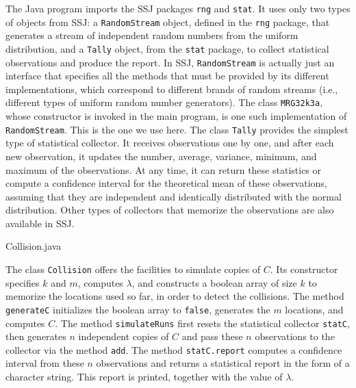 The Java program imports the SSJ packages \texttt{rng} and \texttt{stat}.
It uses only two types of objects from SSJ:
a \texttt{RandomStream} object, defined in the \texttt{rng} package,
that generates a stream of independent random numbers from the uniform distribution,
and a \texttt{Tally} object, from the \texttt{stat} package,
to collect statistical observations and produce the report.
In SSJ, \texttt{RandomStream} is actually just an interface that specifies all
the methods that must be provided by its different implementations, which
correspond to different brands of random streams (i.e., different types of
uniform random number generators).
The class \texttt{MRG32k3a}, whose constructor is invoked in the main program,
is one such implementation of \texttt{RandomStream}.  This is the one we use here.
The class \texttt{Tally} provides the simplest type of statistical collector.
It receives observations one by one, and after each new observation,
it updates the number, average,
variance, minimum, and maximum of the observations.
At any time, it can return these statistics or compute a confidence interval
for the theoretical mean of these observations, assuming that they are
independent and identically distributed with the normal distribution.
Other types of collectors that memorize the observations are also available in SSJ.



{Collision.java}

The class \texttt{Collision} offers the facilities to simulate copies of $C$.
Its constructor specifies $k$ and $m$, computes $\lambda$, and constructs
a boolean array of size $k$ to memorize the locations used so far,
in order to detect the collisions.
The method \texttt{generateC} initializes the boolean array to \texttt{false},
generates the $m$ locations, and computes $C$.
The method \texttt{simulateRuns} first resets the statistical collector \texttt{statC},
then generates $n$ independent copies of $C$ and pass these $n$ observations
to the collector via the method \texttt{add}.
The method \texttt{statC.report} computes a confidence interval from
these $n$ observations and returns a statistical report in the form of a character string.
This report is printed, together with the value of $\lambda$.





